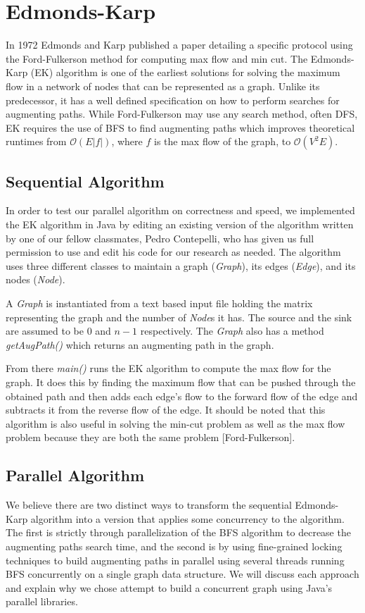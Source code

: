 \section{Edmonds-Karp}
In 1972 Edmonds and Karp published a paper detailing a specific protocol using the Ford-Fulkerson method for computing max flow and min cut. The Edmonds-Karp (EK) algorithm is one of the earliest solutions for solving the maximum flow in a network of nodes that can be represented as a graph. Unlike its predecessor, it has a well defined specification on how to perform searches for augmenting paths. While Ford-Fulkerson may use any search method, often DFS, EK requires the use of BFS to find augmenting paths which improves theoretical runtimes from $\mathcal{O}(E|f|)$, where $f$ is the max flow of the graph, to $\mathcal{O}(V^2E)$.

\subsection{Sequential Algorithm}
In order to test our parallel algorithm on correctness and speed, we implemented the EK algorithm in Java by editing an existing version of the algorithm written by one of our fellow classmates, Pedro Contepelli, who has given us full permission to use and edit his code for our research as needed. The algorithm uses three different classes to maintain a graph (\textit{Graph}), its edges (\textit{Edge}), and its nodes (\textit{Node}).  
    
A \textit{Graph} is instantiated from a text based input file holding the matrix representing the graph and the number of \textit{Node}s it has. The source and the sink are assumed to be $0$ and $n-1$ respectively. The \textit{Graph} also has a method \textit{getAugPath()} which returns an augmenting path in the graph.

From there \textit{main()} runs the EK algorithm to compute the max flow for the graph. It does this by finding the maximum flow that can be pushed through the obtained path and then adds each edge's flow to the forward flow of the edge and subtracts it from the reverse flow of the edge. It should be noted that this algorithm is also useful in solving the min-cut problem as well as the max flow problem because they are both the same problem [Ford-Fulkerson].
    
\subsection{Parallel Algorithm}
We believe there are two distinct ways to transform the sequential Edmonds-Karp algorithm into a version that applies some concurrency to the algorithm. The first is strictly through parallelization of the BFS algorithm to decrease the augmenting paths search time, and the second is by using fine-grained locking techniques to build augmenting paths in parallel using several threads running BFS concurrently on a single graph data structure. We will discuss each approach and explain why we chose attempt to build a concurrent graph using Java's parallel libraries.
    
